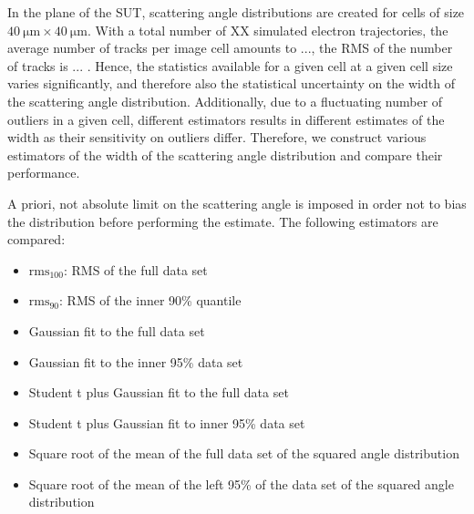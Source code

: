 \documentclass{PoS}
\newcommand{\rmshundred}{\ensuremath{\textrm{rms}_\textrm{100}}}
\newcommand{\rmsninety}{\ensuremath{\textrm{rms}_\textrm{90}}}
\begin{document}
In the plane of the SUT, scattering angle distributions are created for cells of size $\SI{40}{\um} \times \SI{40}{\um}$. 
With a total number of XX simulated electron trajectories, the average number of tracks per image cell amounts to ..., the RMS of the number of tracks is ... .
Hence, the statistics available for a given cell at a given cell size varies significantly, and therefore also the statistical uncertainty on the width of the scattering angle distribution. 
Additionally, due to a fluctuating number of outliers in a given cell, different estimators results in different estimates of the width as their sensitivity on outliers differ. 
Therefore, we construct various estimators of the width of the scattering angle distribution and compare their performance. 

A priori, not absolute limit on the scattering angle is imposed in order not to bias the distribution before performing the estimate. 
The following estimators are compared:
\begin{itemize}
 \item $\rmshundred$: RMS of the full data set
 \item $\rmsninety$: RMS of the inner 90\% quantile
 \item Gaussian fit to the full data set
 \item Gaussian fit to the inner 95\% data set
 \item Student t plus Gaussian fit to the full data set
 \item Student t plus Gaussian fit to inner 95\% data set
 \item Square root of the mean of the full data set of the squared angle distribution
 \item Square root of the mean of the left 95\% of the data set of the squared angle distribution
 
\end{itemize}


%
\end{document}
